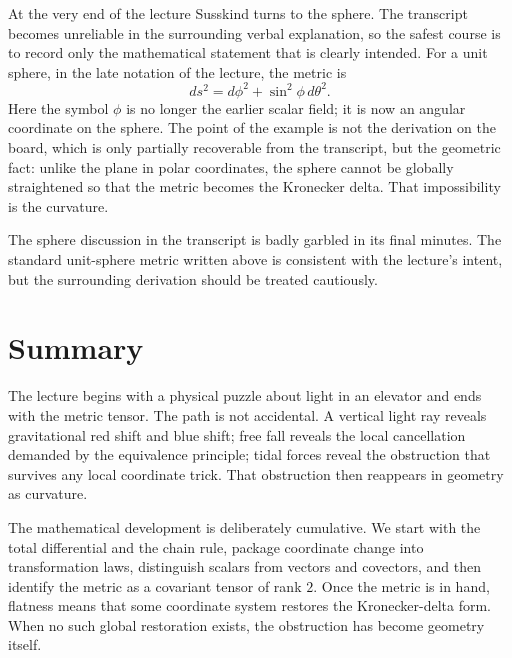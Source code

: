 At the very end of the lecture Susskind turns to the sphere. The transcript becomes unreliable in the surrounding verbal explanation, so the safest course is to record only the mathematical statement that is clearly intended. For a unit sphere, in the late notation of the lecture, the metric is
\begin{equation}
ds^{2}=d\phi^{2}+\sin^{2}\phi\,d\theta^{2}.
\end{equation}
Here the symbol \(\phi\) is no longer the earlier scalar field; it is now an angular coordinate on the sphere. The point of the example is not the derivation on the board, which is only partially recoverable from the transcript, but the geometric fact: unlike the plane in polar coordinates, the sphere cannot be globally straightened so that the metric becomes the Kronecker delta. That impossibility is the curvature.

\begin{remark}
The sphere discussion in the transcript is badly garbled in its final minutes. The standard unit-sphere metric written above is consistent with the lecture's intent, but the surrounding derivation should be treated cautiously.
\end{remark}

\section{Summary}

The lecture begins with a physical puzzle about light in an elevator and ends with the metric tensor. The path is not accidental. A vertical light ray reveals gravitational red shift and blue shift; free fall reveals the local cancellation demanded by the equivalence principle; tidal forces reveal the obstruction that survives any local coordinate trick. That obstruction then reappears in geometry as curvature.

The mathematical development is deliberately cumulative. We start with the total differential and the chain rule, package coordinate change into transformation laws, distinguish scalars from vectors and covectors, and then identify the metric as a covariant tensor of rank \(2\). Once the metric is in hand, flatness means that some coordinate system restores the Kronecker-delta form. When no such global restoration exists, the obstruction has become geometry itself.